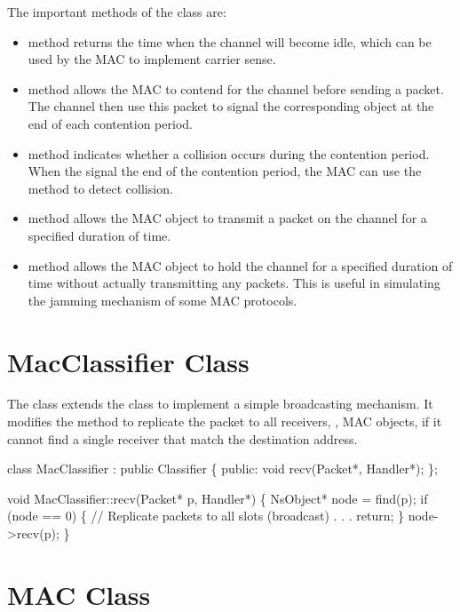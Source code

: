 The important methods of the class  are:

\begin{itemize}
\item  {} method returns the time when the channel will become
idle, which can be used by the MAC to implement carrier sense.
\item  {} method allows the MAC to contend for the channel
before sending a packet.  The channel then use this packet to signal the
corresponding  object at the end of each contention period.
\item  {} method indicates whether a collision occurs
during the contention period.  When the  signal the end of
the contention period, the MAC can use the  method to
detect collision.
\item  {} method allows the MAC object to transmit a packet on the
channel for a specified duration of time.
\item  {} method allows the MAC object to hold the channel for a
specified duration of time without actually transmitting any packets.
This is useful in simulating the jamming mechanism of some MAC
protocols.
\end{itemize}

\section{MacClassifier Class}
\label{sec:mac_classifier}

The  class extends the  class to
implement a simple broadcasting mechanism.  It modifies the
 method to replicate the packet to all receivers, \ie, MAC
objects, if it cannot find a single receiver that match the destination
address.

\begin{program}
    class MacClassifier : public Classifier \{
    public:
        void recv(Packet*, Handler*);
    \};

    void MacClassifier::recv(Packet* p, Handler*)
    \{
        NsObject* node = find(p);
        if (node == 0) \{
                // Replicate packets to all slots (broadcast)
                . . .
                return;
        \}
        node->recv(p);
    \}
\end{program}


\section{MAC Class}
\label{sec:mac}

